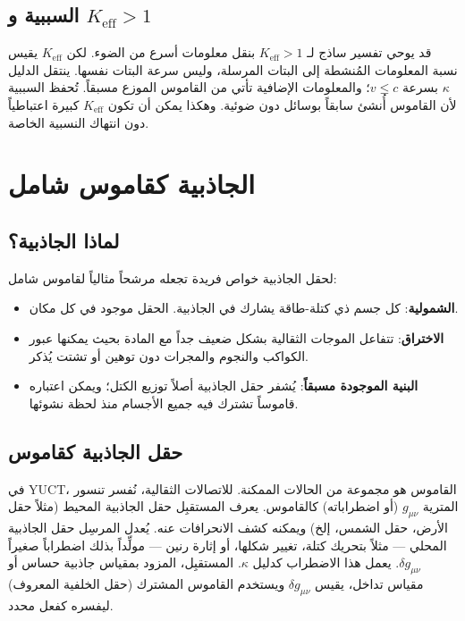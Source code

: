 \documentclass[11pt,a4paper]{article}
\newcommand{\Keff}{K_{\mathrm{eff}}}
\begin{document}
	\subsection{السببية و \(K_{\mathrm{eff}} > 1\)}
	\label{subsec:causality}
	
	قد يوحي تفسير ساذج لـ \(\Keff > 1\) بنقل معلومات أسرع من الضوء. لكن \(\Keff\) يقيس نسبة المعلومات المُنشطة إلى البتات المرسلة، وليس سرعة البتات نفسها. ينتقل الدليل \(\kappa\) بسرعة \(v \le c\)؛ والمعلومات الإضافية تأتي من القاموس الموزع مسبقاً. تُحفظ السببية لأن القاموس أُنشئ سابقاً بوسائل دون ضوئية. وهكذا يمكن أن تكون \(\Keff\) كبيرة اعتباطياً دون انتهاك النسبية الخاصة.
	
	\section{الجاذبية كقاموس شامل}
	\label{sec:gravity}
	
	\subsection{لماذا الجاذبية؟}
	
	لحقل الجاذبية خواص فريدة تجعله مرشحاً مثالياً لقاموس شامل:
	\begin{itemize}
		\item \textbf{الشمولية}: كل جسم ذي كتلة-طاقة يشارك في الجاذبية. الحقل موجود في كل مكان.
		\item \textbf{الاختراق}: تتفاعل الموجات الثقالية بشكل ضعيف جداً مع المادة بحيث يمكنها عبور الكواكب والنجوم والمجرات دون توهين أو تشتت يُذكر.
		\item \textbf{البنية الموجودة مسبقاً}: يُشفر حقل الجاذبية أصلاً توزيع الكتل؛ ويمكن اعتباره قاموساً تشترك فيه جميع الأجسام منذ لحظة نشوئها.
	\end{itemize}
	
	\subsection{حقل الجاذبية كقاموس}
	
	في YUCT، القاموس هو مجموعة من الحالات الممكنة. للاتصالات الثقالية، نُفسر تنسور المترية \(g_{\mu\nu}\) (أو اضطراباته) كالقاموس. يعرف المستقبِل حقل الجاذبية المحيط (مثلاً حقل الأرض، حقل الشمس، إلخ) ويمكنه كشف الانحرافات عنه. يُعدل المرسِل حقل الجاذبية المحلي — مثلاً بتحريك كتلة، تغيير شكلها، أو إثارة رنين — مولِّداً بذلك اضطراباً صغيراً \(\delta g_{\mu\nu}\). يعمل هذا الاضطراب كدليل \(\kappa\). المستقبِل، المزود بمقياس جاذبية حساس أو مقياس تداخل، يقيس \(\delta g_{\mu\nu}\) ويستخدم القاموس المشترك (حقل الخلفية المعروف) ليفسره كفعل محدد.
	
\end{document}
